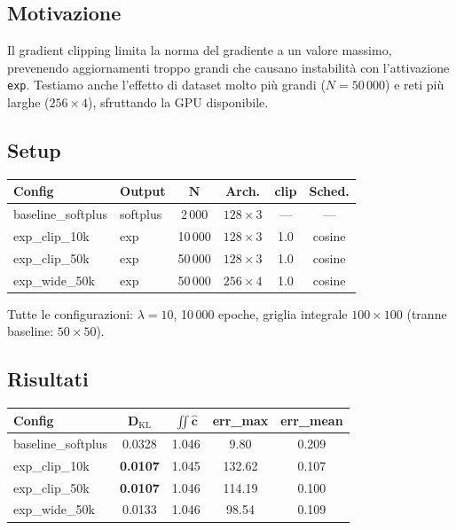 \documentclass[11pt, a4paper]{article}
\begin{document}
\subsection{Motivazione}

Il gradient clipping limita la norma del gradiente a un valore massimo, prevenendo aggiornamenti troppo grandi che causano instabilità con l'attivazione \texttt{exp}. Testiamo anche l'effetto di dataset molto più grandi ($N = 50\,000$) e reti più larghe ($256 \times 4$), sfruttando la GPU disponibile.

\subsection{Setup}

\begin{center}
\begin{tabular}{llcccc}
\toprule
\textbf{Config} & \textbf{Output} & $\boldsymbol{N}$ & \textbf{Arch.} & \textbf{clip} & \textbf{Sched.} \\
\midrule
baseline\_softplus & softplus & 2\,000  & $128 \times 3$ & --- & --- \\
exp\_clip\_10k     & exp      & 10\,000 & $128 \times 3$ & 1.0 & cosine \\
exp\_clip\_50k     & exp      & 50\,000 & $128 \times 3$ & 1.0 & cosine \\
exp\_wide\_50k     & exp      & 50\,000 & $256 \times 4$ & 1.0 & cosine \\
\bottomrule
\end{tabular}
\end{center}

Tutte le configurazioni: $\lambda = 10$, 10\,000 epoche, griglia integrale $100 \times 100$ (tranne baseline: $50 \times 50$).

\subsection{Risultati}

\begin{center}
\begin{tabular}{lcccc}
\toprule
\textbf{Config} & $\boldsymbol{D_\mathrm{KL}}$ & $\boldsymbol{\iint \hat{c}}$ & \textbf{err\_max} & \textbf{err\_mean} \\
\midrule
baseline\_softplus & 0.0328 & 1.046 &   9.80 & 0.209 \\
exp\_clip\_10k     & \textbf{0.0107} & 1.045 & 132.62 & 0.107 \\
exp\_clip\_50k     & \textbf{0.0107} & 1.046 & 114.19 & 0.100 \\
exp\_wide\_50k     & 0.0133 & 1.046 &  98.54 & 0.109 \\
\bottomrule
\end{tabular}
\end{center}
\end{document}
